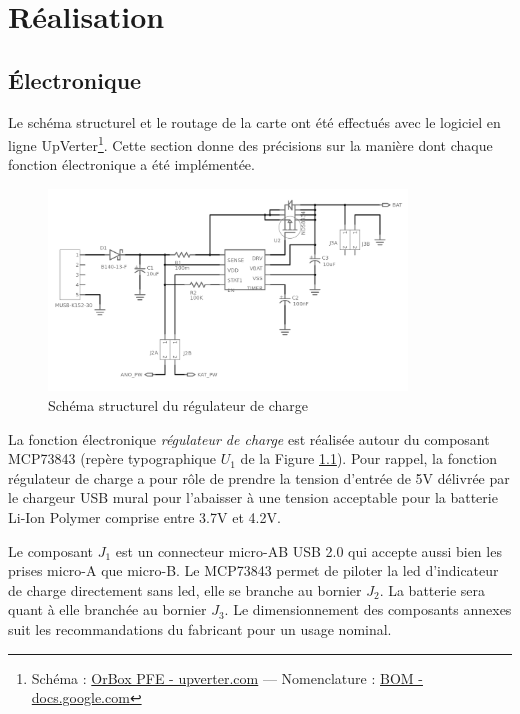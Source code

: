 
\chapter{Réalisation}
    \section{Électronique}
    
    Le schéma structurel et le routage de la carte ont été effectués avec le logiciel en ligne UpVerter\footnote{Schéma : \href{https://upverter.com/OrboxTeam/cfa40d292bac9e7b/Orbox_PFE/}{OrBox PFE - upverter.com} --- Nomenclature : \href{https://docs.google.com/spreadsheets/d/1U8SqlsJ5GUVQXFXz04T_kTUTFbFambgKo4qdCGi8VkM/edit?usp=sharing}{BOM - docs.google.com}}. Cette section donne des précisions sur la manière dont chaque fonction électronique a été implémentée. 
        
\begin{figure}[H]
    \centerline{
        \includegraphics[width=0.85\textwidth,fbox]{img/ElecSch_BatCharger}
    }
    \caption{Schéma structurel du régulateur de charge}
    \label{ElecSch_BatCharger}
\end{figure}

    La fonction électronique \emph{régulateur de charge} est réalisée autour du composant MCP73843 (repère typographique $U_1$ de la Figure \ref{ElecSch_BatCharger}).
    Pour rappel, la fonction régulateur de charge a pour rôle de prendre la tension d'entrée de 5V délivrée par le chargeur USB mural pour l'abaisser à une tension acceptable pour la batterie Li-Ion Polymer comprise entre 3.7V et 4.2V.
    
    Le composant $J_1$ est un connecteur micro-AB USB 2.0 qui accepte aussi bien les prises micro-A que micro-B.
    Le MCP73843 permet de piloter la led d'indicateur de charge directement sans led, elle se branche au bornier $J_2$.
    La batterie sera quant à elle branchée au bornier $J_3$.
    Le dimensionnement des composants annexes suit les recommandations du fabricant pour un usage nominal.

